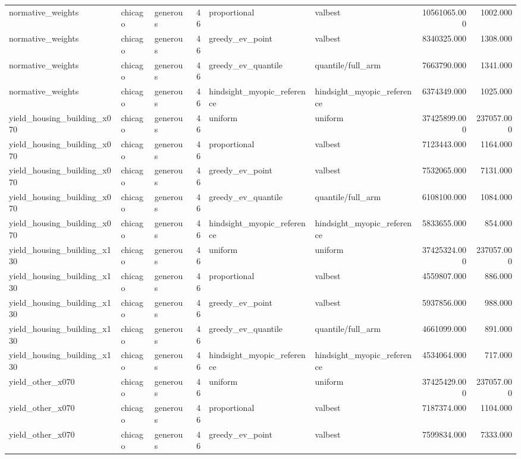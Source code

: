 \begin{tabular}{lllrllrr}
normative\_weights & chicago & generous & 46 & proportional & valbest & 10561065.000 & 1002.000 \\
normative\_weights & chicago & generous & 46 & greedy\_ev\_point & valbest & 8340325.000 & 1308.000 \\
normative\_weights & chicago & generous & 46 & greedy\_ev\_quantile & quantile/full\_arm & 7663790.000 & 1341.000 \\
normative\_weights & chicago & generous & 46 & hindsight\_myopic\_reference & hindsight\_myopic\_reference & 6374349.000 & 1025.000 \\
yield\_housing\_building\_x070 & chicago & generous & 46 & uniform & uniform & 37425899.000 & 237057.000 \\
yield\_housing\_building\_x070 & chicago & generous & 46 & proportional & valbest & 7123443.000 & 1164.000 \\
yield\_housing\_building\_x070 & chicago & generous & 46 & greedy\_ev\_point & valbest & 7532065.000 & 7131.000 \\
yield\_housing\_building\_x070 & chicago & generous & 46 & greedy\_ev\_quantile & quantile/full\_arm & 6108100.000 & 1084.000 \\
yield\_housing\_building\_x070 & chicago & generous & 46 & hindsight\_myopic\_reference & hindsight\_myopic\_reference & 5833655.000 & 854.000 \\
yield\_housing\_building\_x130 & chicago & generous & 46 & uniform & uniform & 37425324.000 & 237057.000 \\
yield\_housing\_building\_x130 & chicago & generous & 46 & proportional & valbest & 4559807.000 & 886.000 \\
yield\_housing\_building\_x130 & chicago & generous & 46 & greedy\_ev\_point & valbest & 5937856.000 & 988.000 \\
yield\_housing\_building\_x130 & chicago & generous & 46 & greedy\_ev\_quantile & quantile/full\_arm & 4661099.000 & 891.000 \\
yield\_housing\_building\_x130 & chicago & generous & 46 & hindsight\_myopic\_reference & hindsight\_myopic\_reference & 4534064.000 & 717.000 \\
yield\_other\_x070 & chicago & generous & 46 & uniform & uniform & 37425429.000 & 237057.000 \\
yield\_other\_x070 & chicago & generous & 46 & proportional & valbest & 7187374.000 & 1104.000 \\
yield\_other\_x070 & chicago & generous & 46 & greedy\_ev\_point & valbest & 7599834.000 & 7333.000 \\

\end{tabular}
